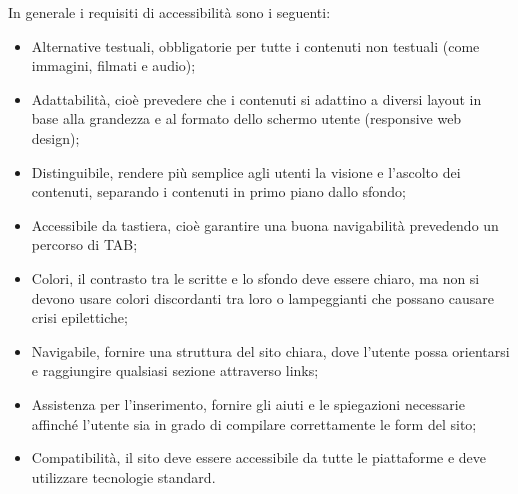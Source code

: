 In generale i requisiti di accessibilità sono i seguenti:
\begin{itemize}
    \item Alternative testuali, obbligatorie per tutte i contenuti non testuali (come immagini, filmati e audio);
    \item Adattabilità, cioè prevedere che i contenuti si adattino a diversi layout in base alla grandezza e al formato dello schermo utente (responsive web design);
    \item Distinguibile, rendere più semplice agli utenti la visione e l'ascolto dei contenuti, separando i contenuti in primo piano dallo sfondo;
    \item Accessibile da tastiera, cioè garantire una buona navigabilità prevedendo un percorso di TAB;
    \item Colori, il contrasto tra le scritte e lo sfondo deve essere chiaro, ma non si devono usare colori discordanti tra loro o lampeggianti che possano causare crisi epilettiche;
    \item Navigabile, fornire una struttura del sito chiara, dove l'utente possa orientarsi e raggiungire qualsiasi sezione attraverso links;
    \item Assistenza per l'inserimento, fornire gli aiuti e le spiegazioni necessarie affinché l'utente sia in grado di compilare correttamente le form del sito;
    \item Compatibilità, il sito deve essere accessibile da tutte le piattaforme e deve utilizzare tecnologie standard.
\end{itemize}


